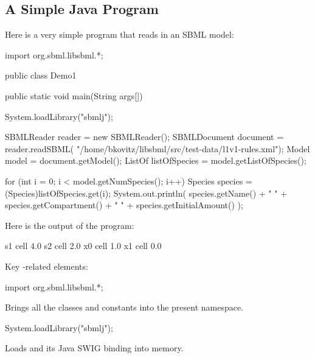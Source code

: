 \documentclass{sbmlmanual}
\begin{document}
\subsection{A Simple Java \libsbml{} Program}
\label{sec:simple-java-program}

   Here is a very simple program that reads in an SBML model:

\begin{boxedCodeVerbatim}
import org.sbml.libsbml.*;

public class Demo1
{
   public static void main(String args[])
   {
      System.loadLibrary("sbmlj");

      SBMLReader reader = new SBMLReader();
      SBMLDocument document = reader.readSBML(
         "/home/bkovitz/libsbml/src/test-data/l1v1-rules.xml");
      Model model = document.getModel();
      ListOf listOfSpecies = model.getListOfSpecies();

      for (int i = 0; i < model.getNumSpecies(); i++) {
         Species species = (Species)listOfSpecies.get(i);
         System.out.println(
            species.getName() + "  " +
            species.getCompartment() + "  " +
            species.getInitialAmount()
         );
      }
   }
}
\end{boxedCodeVerbatim}

Here is the output of the program:

\begin{shellVerbatim}
   s1  cell  4.0
   s2  cell  2.0
   x0  cell  1.0
   x1  cell  0.0
\end{shellVerbatim}

Key \libsbml{}-related elements:

\begin{shellVerbatim}
import org.sbml.libsbml.*;
\end{shellVerbatim}

   Brings all the \libsbml{} classes and constants into the
   present namespace.

\begin{shellVerbatim}
System.loadLibrary("sbmlj");
\end{shellVerbatim}

   Loads \libsbml{} and its Java SWIG binding into memory.
\end{document}
